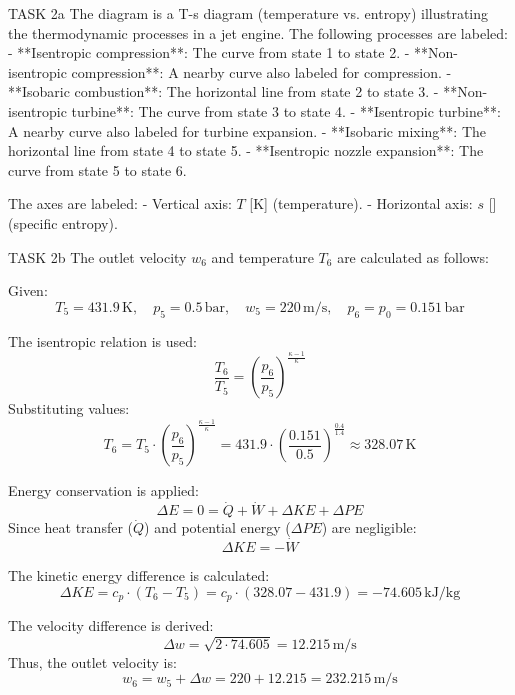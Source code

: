 TASK 2a  
The diagram is a T-s diagram (temperature vs. entropy) illustrating the thermodynamic processes in a jet engine. The following processes are labeled:  
- **Isentropic compression**: The curve from state 1 to state 2.  
- **Non-isentropic compression**: A nearby curve also labeled for compression.  
- **Isobaric combustion**: The horizontal line from state 2 to state 3.  
- **Non-isentropic turbine**: The curve from state 3 to state 4.  
- **Isentropic turbine**: A nearby curve also labeled for turbine expansion.  
- **Isobaric mixing**: The horizontal line from state 4 to state 5.  
- **Isentropic nozzle expansion**: The curve from state 5 to state 6.  

The axes are labeled:  
- Vertical axis: \( T \) [K] (temperature).  
- Horizontal axis: \( s \) [] (specific entropy).  

TASK 2b  
The outlet velocity \( w_6 \) and temperature \( T_6 \) are calculated as follows:  

Given:  
\[
T_5 = 431.9 \, \text{K}, \quad p_5 = 0.5 \, \text{bar}, \quad w_5 = 220 \, \text{m/s}, \quad p_6 = p_0 = 0.151 \, \text{bar}
\]  

The isentropic relation is used:  
\[
\frac{T_6}{T_5} = \left( \frac{p_6}{p_5} \right)^{\frac{\kappa - 1}{\kappa}}
\]  
Substituting values:  
\[
T_6 = T_5 \cdot \left( \frac{p_6}{p_5} \right)^{\frac{\kappa - 1}{\kappa}} = 431.9 \cdot \left( \frac{0.151}{0.5} \right)^{\frac{0.4}{1.4}} \approx 328.07 \, \text{K}
\]  

Energy conservation is applied:  
\[
\Delta E = 0 = \dot{Q} + \dot{W} + \Delta KE + \Delta PE
\]  
Since heat transfer (\( \dot{Q} \)) and potential energy (\( \Delta PE \)) are negligible:  
\[
\Delta KE = -\dot{W}
\]  

The kinetic energy difference is calculated:  
\[
\Delta KE = c_p \cdot (T_6 - T_5) = c_p \cdot (328.07 - 431.9) = -74.605 \, \text{kJ/kg}
\]  

The velocity difference is derived:  
\[
\Delta w = \sqrt{2 \cdot 74.605} = 12.215 \, \text{m/s}
\]  
Thus, the outlet velocity is:  
\[
w_6 = w_5 + \Delta w = 220 + 12.215 = 232.215 \, \text{m/s}
\]